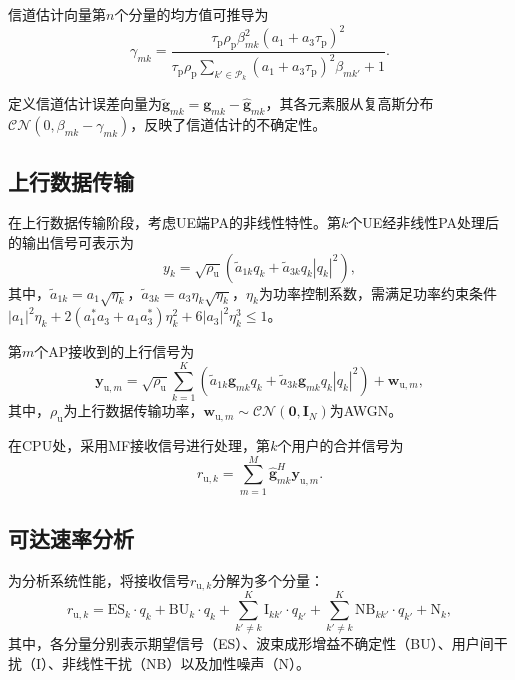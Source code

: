 信道估计向量第$n$个分量的均方值可推导为
\begin{equation}
\gamma_{mk} = \frac{\tau_\text{p}\rho_\text{p}\beta_{mk}^2(a_1+a_3\tau_\text{p})^2}{\tau_\text{p}\rho_\text{p}\sum_{k'\in\mathcal{P}_k}(a_1+a_3\tau_\text{p})^2\beta_{mk'}+1}.
\end{equation}

定义信道估计误差向量为$\tilde{\mathbf{g}}_{mk} = \mathbf{g}_{mk} - \hat{\mathbf{g}}_{mk}$，其各元素服从复高斯分布$\mathcal{CN}(0, \beta_{mk}-\gamma_{mk})$，反映了信道估计的不确定性。

\subsection{上行数据传输}

在上行数据传输阶段，考虑UE端PA的非线性特性。第$k$个UE经非线性PA处理后的输出信号可表示为
\begin{equation}
y_k = \sqrt{\rho_\text{u}}\left(\tilde{a}_{1k}q_k + \tilde{a}_{3k}q_k|q_k|^2\right),
\end{equation}
其中，$\tilde{a}_{1k} = a_1\sqrt{\eta_k}$，$\tilde{a}_{3k} = a_3\eta_k\sqrt{\eta_k}$，$\eta_k$为功率控制系数，需满足功率约束条件$|a_1|^2\eta_k + 2(a_1^*a_3+a_1a_3^*)\eta_k^2 + 6|a_3|^2\eta_k^3 \leq 1$。

第$m$个AP接收到的上行信号为
\begin{equation}
\mathbf{y}_{\text{u},m} = \sqrt{\rho_\text{u}}\sum_{k=1}^{K}\left(\tilde{a}_{1k}\mathbf{g}_{mk}q_k + \tilde{a}_{3k}\mathbf{g}_{mk}q_k|q_k|^2\right) + \mathbf{w}_{\text{u},m},
\end{equation}
其中，$\rho_\text{u}$为上行数据传输功率，$\mathbf{w}_{\text{u},m} \sim \mathcal{CN}(\mathbf{0},\mathbf{I}_N)$为AWGN。

在CPU处，采用MF接收信号进行处理，第$k$个用户的合并信号为
\begin{equation}
r_{\text{u},k} = \sum_{m=1}^{M}\hat{\mathbf{g}}_{mk}^H\mathbf{y}_{\text{u},m}.
\end{equation}

\subsection{可达速率分析}

为分析系统性能，将接收信号$r_{\text{u},k}$分解为多个分量：
\begin{equation}
r_{\text{u},k} = \text{ES}_k \cdot q_k + \text{BU}_k \cdot q_k + \sum_{k'\neq k}^{K}\text{I}_{kk'} \cdot q_{k'} + \sum_{k'\neq k}^{K}\text{NB}_{kk'} \cdot q_{k'} + \text{N}_k,
\end{equation}
其中，各分量分别表示期望信号（ES）、波束成形增益不确定性（BU）、用户间干扰（I）、非线性干扰（NB）以及加性噪声（N）。


